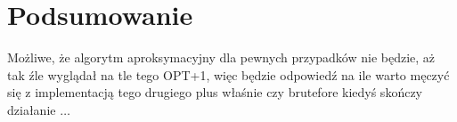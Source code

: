 \chapter*{Podsumowanie}
\thispagestyle{chapterBeginStyle}

Możliwe, że algorytm aproksymacyjny dla pewnych przypadków nie będzie, aż tak źle wyglądał na tle tego OPT+1, więc będzie odpowiedź na ile warto męczyć się z implementacją tego drugiego plus właśnie czy brutefore kiedyś skończy działanie $\ldots$